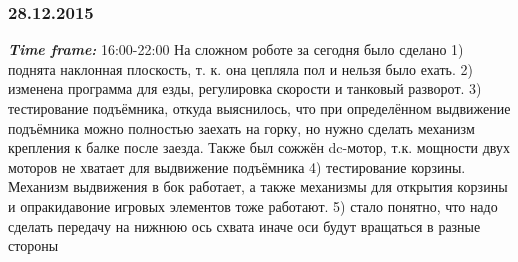 \subsubsection{28.12.2015}
\textit{\textbf{Time frame:}} 16:00-22:00 \newline
На сложном роботе за сегодня было сделано
1) поднята наклонная плоскость, т. к. она цепляла пол и нельзя было ехать.
2) изменена программа для езды, регулировка скорости и танковый разворот.
3) тестирование подъёмника, откуда выяснилось, что при определённом выдвижение подъёмника можно полностью заехать на горку, но нужно сделать механизм крепления к балке после заезда. Также был сожжён dc-мотор, т.к. мощности двух моторов не хватает для выдвижение подъёмника
4) тестирование корзины. Механизм выдвижения в бок работает, а также механизмы для открытия корзины и опракидавоние игровых элементов тоже работают.
5) стало понятно, что надо сделать передачу на нижнюю ось схвата иначе оси будут вращаться в разные стороны

